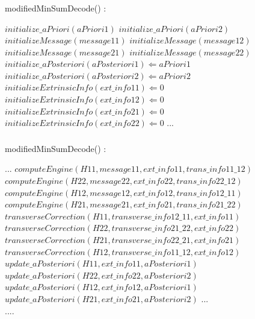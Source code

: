 \documentclass[xcolor=dvipsname]
{beamer}
\begin{document}
\begin{frame}[t]
\frametitle{  }                                 %
\alert{ modifiedMinSumDecode()	: }
\begin{algorithmic}                   
    \STATE $initialize\_aPriori(aPriori1) $
    \STATE $initialize\_aPriori(aPriori2) $
    \STATE $initializeMessage(message11) $
    \STATE $initializeMessage(message12) $
    \STATE $initializeMessage(message21) $
    \STATE $initializeMessage(message22) $
    	\STATE$ initialize\_aPosteriori(aPosteriori1) \Leftarrow aPriori1 $
    	\STATE$ initialize\_aPosteriori(aPosteriori2) \Leftarrow aPriori2 $
   		\STATE $initializeExtrinsicInfo(ext\_info11) \Leftarrow 0 $
   		\STATE $initializeExtrinsicInfo(ext\_info12) \Leftarrow 0 $
   		\STATE $initializeExtrinsicInfo(ext\_info21) \Leftarrow 0 $
   		\STATE $initializeExtrinsicInfo(ext\_info22) \Leftarrow 0 $
   		\STATE ... 
   		\vspace{2cm}		
   		 \ENDWHILE 
\end{algorithmic}
\end{frame}


\begin{frame}[t]
\frametitle{  }                                 %
\alert{ modifiedMinSumDecode()	: }
\begin{algorithmic}   
\STATE ...               
\STATE$computeEngine(H11,message11,ext\_info11,trans\_info11\_12)$
\STATE$computeEngine(H22,message22,ext\_info22,trans\_info22\_12)$
\STATE$computeEngine(H12,message12,ext\_info12,trans\_info12\_11)$
\STATE$computeEngine(H21,message21,ext\_info21,trans\_info21\_22)$
\STATE$transverseCorrection(H11,transverse\_info12\_11,ext\_info11)$
\STATE$transverseCorrection(H22,transverse\_info21\_22,ext\_info22)$
\STATE$transverseCorrection(H21,transverse\_info22\_21,ext\_info21)$
\STATE$transverseCorrection(H12,transverse\_info11\_12,ext\_info12)$
\STATE$update\_aPosteriori (H11 , ext\_info11 ,aPosteriori1)$
\STATE$update\_aPosteriori (H22 , ext\_info22 ,aPosteriori2)$
\STATE$update\_aPosteriori (H12 , ext\_info12 ,aPosteriori1)$
\STATE$update\_aPosteriori (H21 , ext\_info21 ,aPosteriori2)$
\STATE ... \\
     ....	
 \ENDWHILE    


  		
\end{algorithmic}
\end{frame}
\end{document}
